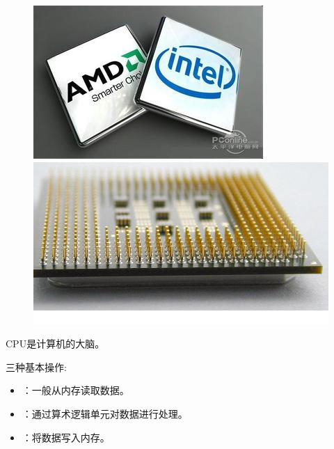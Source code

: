 \begin{frame}[fragile]
\begin{figure}[h] 
\begin{minipage}[t]{0.45\linewidth}
\centering
\includegraphics[width=\textwidth]{ch01/fig/cpu1}
\end{minipage}
\hfill
\begin{minipage}[t]{0.45\linewidth}
\centering
\includegraphics[width=\textwidth]{ch01/fig/cpu2}
\end{minipage}
\end{figure}
\end{frame}

\begin{frame}
CPU是计算机的大脑。

  \vspace{.1in}

三种基本操作: 

\begin{itemize}
\item {}：一般从内存读取数据。 \\[0.1in]
\item {}：通过算术逻辑单元对数据进行处理。 \\[0.1in]
\item {}：将数据写入内存。
\end{itemize}

\end{frame}

